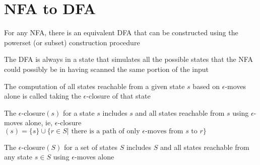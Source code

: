 \documentclass[8pt,a4paper,compress]{beamer}
\begin{document}
\section{NFA to DFA}
\begin{frame}[fragile]
\pause

For any NFA, there is an equivalent DFA that can be constructed using the powerset (or subset) construction procedure

\pause\bigskip

The DFA is always in a state that simulates all the possible states that the NFA could possibly be in having scanned the same portion of the input

\pause\bigskip

The computation of all states reachable from a given state $s$ based on $\epsilon$-moves alone is called taking the $\epsilon$-closure of that state

\pause\bigskip

The $\epsilon$-closure$(s)$ for a state $s$ includes $s$ and all states reachable from $s$ using $\epsilon$-moves alone, ie, $\epsilon$-closure$(s) = \{s\} \cup \{r \in S | \text{ there is a path of only } \epsilon\text{-moves from } s \text{ to } r\}$

\pause\bigskip

The $\epsilon$-closure$(S)$ for a set of states $S$ includes $S$ and all states reachable from any state $s \in S$ using  $\epsilon$-moves alone
\end{frame}
\end{document}
